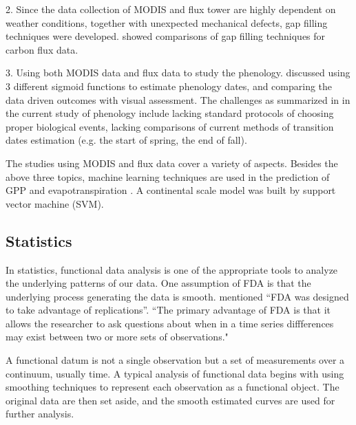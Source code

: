 \documentclass{article}\usepackage[]{graphicx}\usepackage[]{color}
\begin{document}
2. Since the data collection of MODIS and flux tower are highly dependent on weather conditions, together with unexpected mechanical defects, gap filling techniques were  developed. \citet{moffat2007comprehensive} showed comparisons of gap filling techniques for carbon flux data.

3. Using both MODIS data and flux data to study the phenology. \citet{klosterman2014evaluating} discussed using 3 different sigmoid functions to estimate phenology dates, and comparing the data driven outcomes with visual assessment.  The challenges as summarized in \citet{klosterman2014evaluating} in the current study of phenology include lacking standard protocols of choosing proper biological events, lacking comparisons of current methods of transition dates estimation (e.g. the start of spring, the end of fall).

The studies using MODIS and flux data cover a variety of aspects. Besides the above three topics, machine learning techniques are used in the prediction of GPP \citep{yang2007developing} and evapotranspiration \citep{yang2006prediction}.  A continental scale model was built by support vector machine (SVM).   

\subsection{Statistics}

In statistics, functional data analysis is one of the appropriate tools to analyze the underlying patterns of our data. 
One assumption of FDA is that the underlying process generating the data is smooth.
\citet{levitin2007introduction} mentioned ``FDA was designed to take advantage of replications''.
``The primary advantage of FDA is that it allows the researcher to ask questions about when in a time series diffferences may exist between two or more sets of observations." \citep{levitin2007introduction}

A functional datum is not a single observation but a set of measurements over a continuum, usually time.
A typical analysis of functional data begins with using smoothing techniques to represent each observation as a functional object. The original data are then set aside, and the smooth estimated curves are used for further analysis. 
\end{document}

